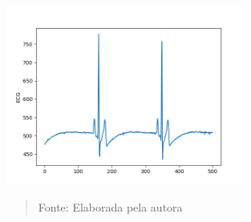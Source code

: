 \documentclass[12pt, a4paper]{article}
\begin{document}
\begin{center}
\begin{itemize}
\begin{figure}[H]
\begin{center}
			\includegraphics[width=0.7\textwidth]{Figure_3-1.png}
       \vspace*{\fill} 
            \begin{quote} 
            \centering 
            Fonte: Elaborada pela autora
            \end{quote}
            \vspace*{\fill}
			\label{fig:eletrodo}
\end{center}
\end{figure}

\end{itemize}

\end{center}

\end{document}
